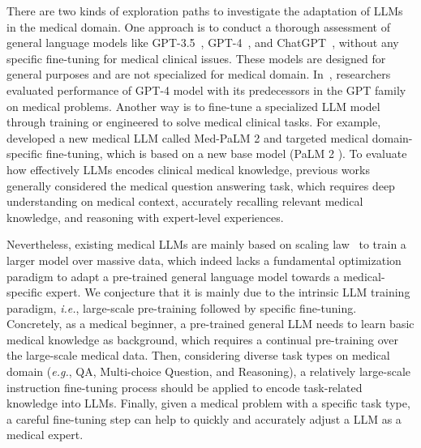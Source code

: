 \documentclass{article} %
\begin{document}
There are two kinds of exploration paths to investigate the adaptation of LLMs in the medical domain. One approach is to conduct a thorough assessment of general language models like GPT-3.5~\citep{brown2020language}, GPT-4~\citep{openai2023gpt4}, and ChatGPT~\citep{chatgpt}, without any specific fine-tuning for medical clinical issues. These models are designed for general purposes and are not specialized for medical domain. In~\citep{nori2023capabilities}, researchers evaluated performance of GPT-4 model with its predecessors in the GPT family on medical problems. Another way is to fine-tune a specialized LLM model through training or engineered to solve medical clinical tasks. For example, \cite{singhal2023expertlevel} developed a new medical LLM called Med-PaLM 2 and targeted medical domain-specific fine-tuning, which is based on a new base model (PaLM 2 \cite{anil2023palm}). To evaluate how effectively LLMs encodes clinical medical knowledge, previous works~\citep{jin-etal-2019-pubmedqa,singhal2023expertlevel} generally considered the medical question answering task, which requires deep understanding on medical context, accurately recalling relevant medical knowledge, and reasoning with expert-level experiences.


Nevertheless, existing medical LLMs are mainly based on scaling law~\citep{chung2022scaling} to train a larger model over massive data, which indeed lacks a fundamental optimization paradigm to adapt a pre-trained general language model towards a medical-specific expert. We conjecture that it is mainly due to the intrinsic LLM training paradigm, \textit{i.e.}, large-scale pre-training followed by specific fine-tuning. Concretely, as a medical beginner, a pre-trained general LLM needs to learn basic medical knowledge as background, which requires a continual pre-training over the large-scale medical data. Then, considering diverse task types on medical domain (\textit{e.g.}, QA, Multi-choice Question, and Reasoning), a relatively large-scale instruction fine-tuning process should be applied to encode task-related knowledge into LLMs. Finally, given a medical problem with a specific task type, a careful fine-tuning step can help to quickly and accurately adjust a LLM as a medical expert.
\end{document}
